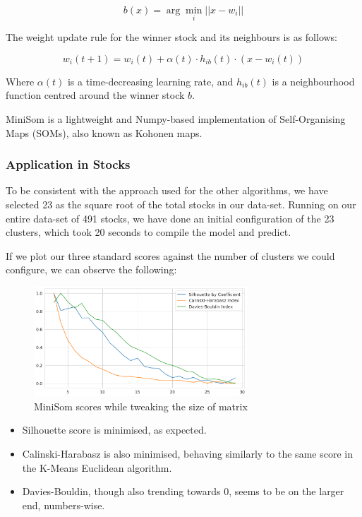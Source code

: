 \documentclass[11pt]{article}
\begin{document}
\begin{equation*}
b(x) = \arg \min_{i} || x - w_i ||
\end{equation*}


The weight update rule for the winner stock and its neighbours is as follows:

\begin{equation*}
w_{i}(t+1) = w_{i}(t) + \alpha(t) \cdot h_{ib}(t) \cdot (x - w_{i}(t))
\end{equation*}

Where \( \alpha(t) \) is a time-decreasing learning rate, and \( h_{ib}(t) \) is a neighbourhood function centred around the winner stock \( b \).


MiniSom is a lightweight and Numpy-based implementation of Self-Organising Maps (SOMs), also known as Kohonen maps. 


\subsubsection{Application in Stocks}

To be consistent with the approach used for the other algorithms, we have selected 23 as the square root of the total stocks in our data-set. Running on our entire data-set of 491 stocks, we have done an initial configuration of the 23 clusters, which took 20 seconds to compile the model and predict.  

If we plot our three standard scores against the number of clusters we could configure, we can observe the following:

\begin{figure}[H]
\centering
\includegraphics[width=8cm]{img/MiniSom-index-comparison.png} 
\caption{MiniSom scores while tweaking the size of matrix}
\end{figure}

\begin{itemize}
    \item Silhouette score is minimised, as expected.
    \item Calinski-Harabasz is also minimised, behaving similarly to the same score in the K-Means Euclidean algorithm.
    \item Davies-Bouldin, though also trending towards 0, seems to be on the larger end, numbers-wise.
\end{itemize}
\end{document}
